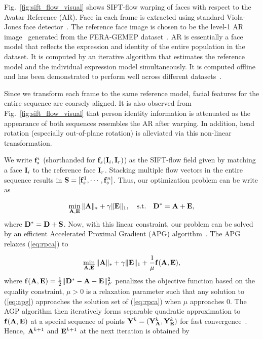 \documentclass[journal]{IEEEtran}
\begin{document}
Fig.~\ref{fig:sift_flow_visual} shows SIFT-flow warping of faces with respect to the Avatar Reference (AR). Face in each frame is extracted using standard Viola-Jones face detector~\cite{Viola_IJCV04}. The reference face image is chosen to be the level-1 AR image~\cite{Yang_SMCB12} generated from the FERA-GEMEP dataset~\cite{Valstar_FERA11}. AR is essentially a face model that reflects the expression and identity of the entire population in the dataset. It is computed by an iterative algorithm that estimates the reference model and the individual expression model simultaneously. It is computed offline and has been demonstrated to perform well across different datasets~\cite{Yang_SMCB12}. 

Since we transform each frame to the same reference model, facial features for the entire sequence are coarsely aligned. It is also observed from Fig.~\ref{fig:sift_flow_visual} that person identity information is attenuated as the appearance of both sequences resembles the AR after warping. In addition, head rotation (especially out-of-plane rotation) is alleviated via this non-linear transformation. 

We write ${\bf f}_s^i$ (shorthanded for ${\bf f}_s({\bf I}_i,{\bf I}_r)$) as the SIFT-flow field given by matching a face ${\bf I}_i$ to the reference face ${\bf I}_r$. Stacking multiple flow vectors in the entire sequence results in ${\bf S} = [{\bf f}_s^1, \cdots,{\bf f}_s^n]$. Thus, our optimization problem can be write as

\begin{equation} \label{eq:rpca}
\min_{\A,\E} \|\A\|_*+\gamma \|\E\|_1,  \quad \text{s.t.} \quad \D^* = \A + \E, 
\end{equation}
where ${\bf D}^*={\bf D}+{\bf S}$. Now, with this linear constraint, our problem can be solved by an efficient Accelerated Proximal Gradient (APG) algorithm~\cite{Beck09}. The APG relaxes (\ref{eq:rpca}) to

\begin{equation} \label{eq:apg}
\min_{\A,\E} \|\A\|_* + \gamma \|\E\|_1 + \frac{1}{\mu}\f(\A,\E),
\end{equation}
\noindent where ${\bf f}({\bf A},{\bf E})=\frac{1}{2}\|{\bf D}^*-{\bf A}-{\bf E}\|^2_F$ penalizes the objective function based on the equality constraint, $\mu>0$ is a relaxation parameter such that any solution to (\ref{eq:apg}) approaches the solution set of (\ref{eq:rpca}) when $\mu$ approaches 0. The AGP algorithm then iteratively forms separable quadratic approximation to ${\bf f}({\bf A},{\bf E})$ at a special sequence of points ${\bf Y}^k=({\bf Y}^k_{\bf A},{\bf Y}^k_{\bf E})$ for fast convergence~\cite{Beck09}. Hence, ${\bf A}^{k+1}$ and ${\bf E}^{k+1}$ at the next iteration is obtained by
\end{document}
